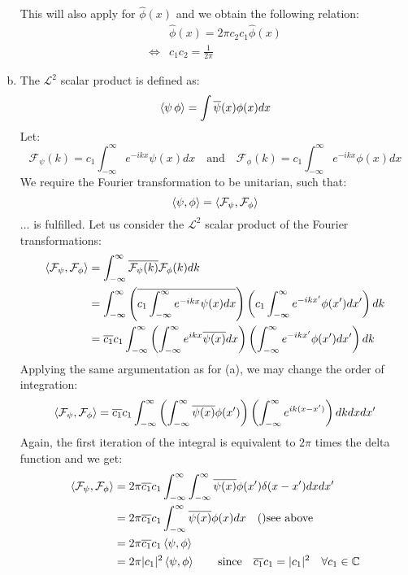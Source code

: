\documentclass[a4paper,german,12pt,smallheadings]{scrartcl}
\begin{document}
\begin{enumerate}[a)]
This will also apply for $\hat{\phi}(x)$ and we obtain the following relation:
\begin{align*}
&\hat{\phi}(x)=2\pi c_2c_1\hat{\phi}(x)\\
\Leftrightarrow & c_1c_2=\frac{1}{2\pi}
\end{align*}

\item

The $\mathcal{L}^2$ scalar product is defined as:
\begin{equation*}
\braket{\psi\,\phi}=\int\overline{\psi}(x)\phi(x)dx
\end{equation*}
Let:
\begin{equation*}
\mathcal{F}_{\psi}(k)=c_1\int_{-\infty}^{\infty}e^{-ikx}\psi(x)dx \quad \text{and} \quad \mathcal{F}_{\phi}(k)=c_1\int_{-\infty}^{\infty}e^{-ikx}\phi(x)dx
\end{equation*}
We require the Fourier transformation to be unitarian, such that:
\begin{equation*}
\braket{\psi,\phi}=\braket{\mathcal{F}_{\psi},\mathcal{F}_{\phi}}
\end{equation*}
... is fulfilled. Let us consider the $\mathcal{L}^2$ scalar product of the Fourier transformations:
\begin{align*}
\braket{\mathcal{F}_{\psi},\mathcal{F}_{\phi}}&=\int_{-\infty}^{\infty}\overline{\mathcal{F}_{\psi}(k)}\mathcal{F}_{\phi}(k)dk\\
&=\int_{-\infty}^{\infty}\left(\overline{c_1\int_{-\infty}^{\infty}e^{-ikx}\psi(x)dx}\right)\left(c_1\int_{-\infty}^{\infty}e^{-ikx'}\phi(x')dx'\right)dk\\
&=\overline{c_1}c_1\int_{-\infty}^{\infty}\left(\int_{-\infty}^{\infty}e^{ikx}\overline{\psi(x)}dx\right)\left(\int_{-\infty}^{\infty}e^{-ikx'}\phi(x')dx'\right)dk
\end{align*}
Applying the same argumentation as for (a), we may change the order of integration:
\begin{equation*}
\braket{\mathcal{F}_{\psi},\mathcal{F}_{\phi}}=\overline{c_1}c_1\int_{-\infty}^{\infty}\left(\int_{-\infty}^{\infty}\overline{\psi(x)}\phi(x')\right)\left(\int_{-\infty}^{\infty}e^{ik(x-x')}\right)dkdxdx'
\end{equation*}
Again, the first iteration of the integral is equivalent to $2\pi$ times the delta function and we get:
\begin{align*}
\braket{\mathcal{F}_{\psi},\mathcal{F}_{\phi}}&=2\pi\overline{c_1}c_1\int_{-\infty}^{\infty}\int_{-\infty}^{\infty}\overline{\psi(x)}\phi(x')\delta(x-x')dxdx'\\
&=2\pi \overline{c_1}c_1\int_{-\infty}^{\infty}\overline{\psi(x)}\phi(x)dx \quad \text{()see above}\\
&=2\pi\overline{c_1}c_1\braket{\psi,\phi}\\
&=2\pi|c_1|^2\braket{\psi,\phi} \quad \quad \text{since} \quad \overline{c_1}c_1=|c_1|^2 \quad \forall c_1\in\mathbb{C}
\end{align*}


\end{enumerate}
\end{document}
